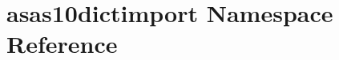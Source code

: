 \hypertarget{namespaceasas10dictimport}{\section{asas10dictimport Namespace Reference}
\label{namespaceasas10dictimport}
}
